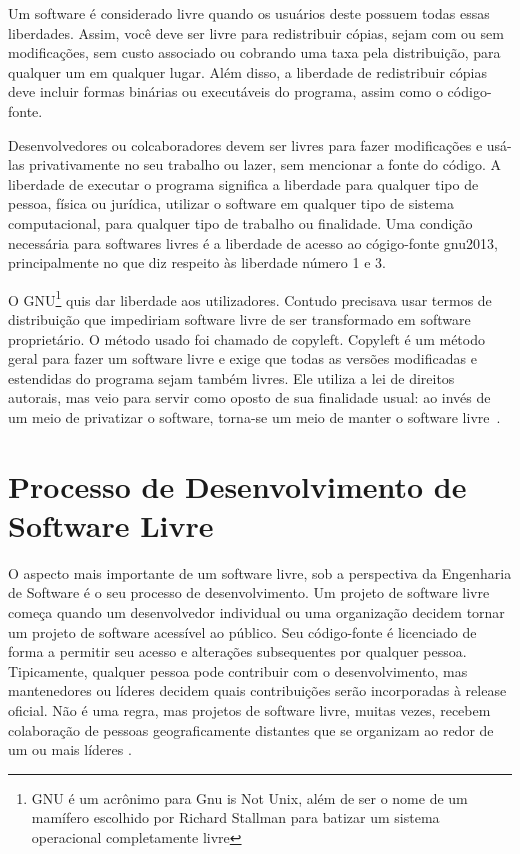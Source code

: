 Um software é considerado livre quando os usuários deste possuem todas essas liberdades. Assim, você deve ser livre para redistribuir cópias, sejam com ou sem modificações, sem custo associado ou cobrando uma taxa pela distribuição, para qualquer um em qualquer lugar. Além disso, a liberdade de redistribuir cópias deve incluir formas binárias ou executáveis do programa, assim como o código-fonte.

Desenvolvedores ou colcaboradores devem ser livres para fazer modificações e usá-las privativamente no seu trabalho ou lazer, sem mencionar a fonte do código. A liberdade de executar o programa significa a liberdade para qualquer tipo de pessoa, física ou jurídica, utilizar o software em qualquer tipo de sistema computacional, para qualquer tipo de trabalho ou finalidade. Uma condição necessária para softwares livres é a liberdade de acesso ao cógigo-fonte {gnu2013}, principalmente no que diz respeito às liberdade número 1 e 3.


%
O GNU\footnote{GNU é um acrônimo para Gnu is Not Unix, além de ser o nome de um mamífero escolhido por Richard Stallman para batizar um sistema operacional completamente livre} quis dar liberdade aos utilizadores. Contudo precisava usar termos de distribuição que impediriam software livre de ser transformado em software proprietário. O método usado foi chamado de copyleft. Copyleft é um método geral para fazer um software livre e exige que todas as versões modificadas e estendidas do programa sejam também livres. Ele utiliza a lei de direitos autorais, mas veio para servir como oposto de sua finalidade usual: ao invés de um meio de privatizar o software, torna-se um meio de manter o software livre~\cite{stallman2009}.

\section{Processo de Desenvolvimento de Software Livre}
\label{sec-proc-sl}

O aspecto mais importante de um software livre, sob a perspectiva da Engenharia de Software é o seu processo de desenvolvimento. Um projeto de software livre começa quando um desenvolvedor individual ou uma organização decidem tornar um projeto de software acessível ao público. Seu código-fonte é licenciado de forma a permitir seu acesso e alterações subsequentes por qualquer pessoa. Tipicamente, qualquer pessoa pode contribuir com o desenvolvimento, mas mantenedores ou líderes decidem quais contribuições serão incorporadas à release oficial. Não é uma regra, mas projetos de software livre, muitas vezes, recebem colaboração de pessoas geograficamente distantes que se organizam ao redor de um ou mais líderes \cite{corbucci2011freemethods}. 

